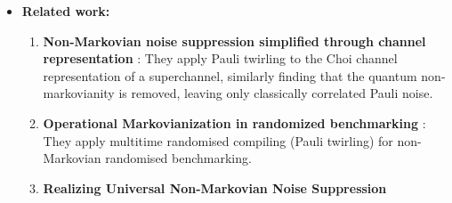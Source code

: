 {\begin{itemize}
\begin{enumerate}
    \end{enumerate}
    \item \textbf{Related work:}
    \begin{enumerate}
        \item \textbf{Non-Markovian noise suppression simplified through channel representation} \cite{liuNonMarkovianNoiseSuppression2024}: They apply Pauli twirling to the Choi channel representation of a superchannel, similarly finding that the quantum non-markovianity is removed, leaving only classically correlated Pauli noise.
        \item \textbf{Operational Markovianization in randomized benchmarking} \cite{figueroa-romeroOperationalMarkovianizationRandomized2024}: They apply multitime randomised compiling (Pauli twirling) for non-Markovian randomised benchmarking.
        \item \textbf{Realizing Universal Non-Markovian Noise Suppression} \cite{liuRealizingUniversalNonMarkovian2025}
    \end{enumerate}
\end{itemize}}

